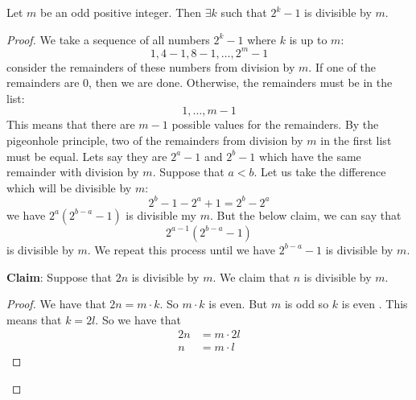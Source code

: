 \documentclass{report}
\begin{document}
\begin{examples}
    \begin{example}
        Let $m$ be an odd positive integer. Then $\exists k$ such that $2^{k} - 1$ is divisible by $m$.
        \begin{proof}
            We take a sequence of all numbers $2^{k} - 1$ where $k$ is up to $m$:
                \begin{equation*}
                    1, 4 - 1, 8 -1, \ldots, 2^{m} - 1
                \end{equation*}
            consider the remainders of these numbers from division by $m$. If one of the remainders are 0, then we are done. Otherwise, the remainders must be in the list:
                \begin{equation*}
                    1, \ldots, m - 1
                \end{equation*}
            This means that there are $m - 1$ possible values for the remainders. By the pigeonhole principle, two of the remainders from division by $m$ in the first list must be equal. Lets say they are $2^{a} - 1$ and $2^{b} - 1$ which have the same remainder with division by $m$. Suppose that $a < b$. Let us take the difference which will be divisible by $m$: 
                \begin{equation*}
                    2^{b} - 1 - 2^{a} + 1 = 2^{b} - 2^{a}
                \end{equation*}
            we have $2^{a}(2^{b - a} - 1)$ is divisible my $m$. But the below claim, we can say that 
                \begin{equation*}
                    2^{a - 1}(2^{b - a} - 1)
                \end{equation*}
            is divisible by $m$. We repeat this process until we have $2^{b - a} - 1$ is divisible by $m$.


            \textbf{Claim}: Suppose that $2n$ is divisible by $m$. We claim that $n$ is divisible by $m$. 
                \begin{proof}
                     We have that $2n = m \cdot k$. So $m \cdot k$ is even. But $m$ is odd so $k$ is even . This means that $k = 2l$. So we have that 
                     \begin{align*}
                         2n &= m \cdot 2l \\
                         n  &= m \cdot l    
                     \end{align*}
                \end{proof}
        \end{proof}
    \end{example}
\end{examples}
\end{document}
